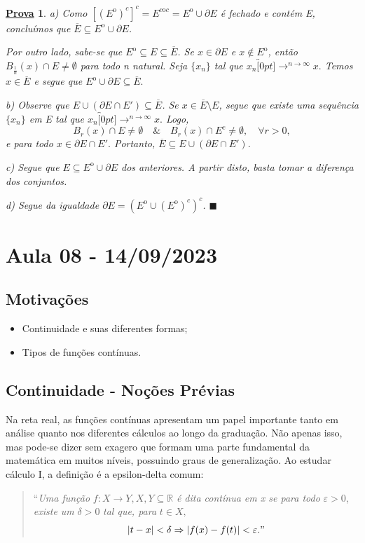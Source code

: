 \documentclass{article}
\newtheorem*{proof*}{\underline{Prova}}
\renewcommand\qedsymbol{$\blacksquare$}
\begin{document}
\begin{proof*}
a) Como \([({E}^{\mathrm{o}})^{c}]^{c} = E^{c\mathrm{o}c}={E}^{\mathrm{o}}\cup \partial E\) é fechado
e contém E, concluímos que \(\overline{E}\subseteq{{E}^{\mathrm{o}}}\cup \partial E\). 

  Por outro lado, sabe-se que \({E}^{\mathrm{o}}\subseteq{E}\subseteq{\overline{E}}\). Se \(x\in \partial E\) e \(x\not\in {E}^{\mathrm{o}}\),
então \(B_{\frac{1}{n}}(x)\cap E \neq\emptyset\) para todo n natural. Seja \(\{x_{n}\}\) tal que \(x_{n}\overbracket[0pt]{\longrightarrow}^{n\to\infty }x.\)
Temos \(x\in \overline{E}\) e segue que \({E}^{\mathrm{o}}\cup \partial E \subseteq{\overline{E}}.\) 

b) Observe que \(E\cup(\partial E\cap E')\subseteq{\overline{E}}\). Se \(x\in\overline{E}\setminus{E}\), segue que 
existe uma sequência \(\{x_{n}\}\) em E tal que \(x_{n}\overbracket[0pt]{\longrightarrow}^{n\to \infty}x.\) Logo, 
  \[
    B_{r}(x)\cap E \neq\emptyset\quad\&\quad B_{r}(x)\cap E^{c} \neq\emptyset,\quad \forall r>0,
  \]
e para todo \(x\in \partial E\cap E'.\) Portanto, \(\overline{E}\subseteq{E\cup(\partial E\cap E')}.\)

c) Segue que \(E\subseteq{{E}^{\mathrm{o}}\cup \partial E}\) dos anteriores. A partir disto, basta tomar 
a diferença dos conjuntos.

d) Segue da igualdade \(\partial E = ({E}^{\mathrm{o}}\cup ({E}^{\mathrm{o}})^{c})^{c}\).
\qedsymbol

\end{proof*}
\newpage

\section{Aula 08 - 14/09/2023}
\subsection{Motivações}
\begin{itemize}
  \item Continuidade e suas diferentes formas;
  \item Tipos de funções contínuas.
\end{itemize}
\subsection{Continuidade - Noções Prévias}
  Na reta real, as funções contínuas apresentam um papel importante tanto em análise quanto nos diferentes cálculos ao longo da graduação. Não apenas isso, mas
pode-se dizer sem exagero que formam uma parte fundamental da matemática em muitos níveis, possuindo graus de generalização. Ao estudar cálculo I, a definição é
a epsilon-delta comum:
\begin{quote}
  ``\textit{Uma função} \(f:X\rightarrow Y, X, Y\subseteq{\mathbb{R}}\) \textit{é dita contínua em x se para todo} \(\varepsilon >0\), \textit{existe um} \(\delta >0\) \textit{tal que, para }\(t\in X,\) 
    \[
      |t-x| < \delta \Rightarrow |f(x)-f(t)| < \varepsilon."
    \]
\end{quote}
\end{document}
